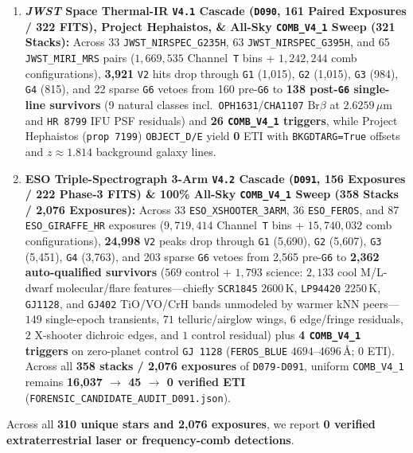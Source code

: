 \documentclass[twocolumn,10pt]{article}
\begin{document}
\begin{enumerate}
  \item \textbf{\textit{JWST} Space Thermal-IR \texttt{V4.1} Cascade (\texttt{D090}, 161 Paired Exposures / 322 FITS), Project Hephaistos, \& All-Sky \texttt{COMB\_V4\_1} Sweep (321 Stacks):} Across 33 \texttt{JWST\_NIRSPEC\_G235H}, 63 \texttt{JWST\_NIRSPEC\_G395H}, and 65 \texttt{JWST\_MIRI\_MRS} pairs ($1{,}669{,}535$ Channel~\texttt{T} bins + $1{,}242{,}244$ comb configurations), \textbf{3,921} \texttt{V2} hits drop through \texttt{G1} (1,015), \texttt{G2} (1,015), \texttt{G3} (984), \texttt{G4} (815), and 22 sparse \texttt{G6} vetoes from 160 pre-\texttt{G6} to \textbf{138 post-\texttt{G6} single-line survivors} (9 natural classes incl.\ \texttt{OPH1631}/\texttt{CHA1107} $\mathrm{Br}\beta$ at $2.6259\,\mu\text{m}$ and \texttt{HR\,8799} IFU PSF residuals) and \textbf{26 \texttt{COMB\_V4\_1} triggers}, while Project Hephaistos \cite{Suazo2024} (\texttt{prop~7199}) \texttt{OBJECT\_D/E} yield \textbf{0} ETI with \texttt{BKGDTARG=True} offsets and $z\approx 1.814$ background galaxy lines.
  \item \textbf{ESO Triple-Spectrograph 3-Arm \texttt{V4.2} Cascade (\texttt{D091}, 156 Exposures / 222 Phase-3 FITS) \& 100\% All-Sky \texttt{COMB\_V4\_1} Sweep (358 Stacks / 2,076 Exposures):} Across 33 \texttt{ESO\_XSHOOTER\_3ARM}, 36 \texttt{ESO\_FEROS}, and 87 \texttt{ESO\_GIRAFFE\_HR} exposures ($9{,}719{,}414$ Channel~\texttt{T} bins + $15{,}740{,}032$ comb configurations), \textbf{24,998} \texttt{V2} peaks drop through \texttt{G1} (5,690), \texttt{G2} (5,607), \texttt{G3} (5,451), \texttt{G4} (3,763), and 203 sparse \texttt{G6} vetoes from 2,565 pre-\texttt{G6} to \textbf{2,362 auto-qualified survivors} ($569$ control + $1{,}793$ science: $2{,}133$ cool M/L-dwarf molecular/flare features---chiefly \texttt{SCR1845} $2600\,\text{K}$, \texttt{LP94420} $2250\,\text{K}$, \texttt{GJ1128}, and \texttt{GJ402} TiO/VO/CrH bands unmodeled by warmer kNN peers---$149$ single-epoch transients, $71$ telluric/airglow wings, $6$ edge/fringe residuals, $2$ X-shooter dichroic edges, and $1$ control residual) plus \textbf{4 \texttt{COMB\_V4\_1} triggers} on zero-planet control \texttt{GJ\,1128} (\texttt{FEROS\_BLUE} $4694\text{--}4696\,\text{\AA}$; $0$ ETI). Across all \textbf{358 stacks / 2,076 exposures} of \texttt{D079-D091}, uniform \texttt{COMB\_V4\_1} remains \textbf{16,037 $\rightarrow$ 45 $\rightarrow$ 0 verified ETI} (\texttt{FORENSIC\_CANDIDATE\_AUDIT\_D091.json}).
\end{enumerate}
Across all \textbf{310 unique stars and 2,076 exposures}, we report \textbf{0 verified extraterrestrial laser or frequency-comb detections}.
\end{document}
